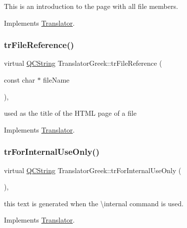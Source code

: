 This is an introduction to the page with all file members. 

Implements \mbox{\hyperlink{class_translator}{Translator}}.

\mbox{\label{class_translator_greek_ab6de6a61c25117b7a42176c9f53621d2}} 
\subsubsection{\texorpdfstring{trFileReference()}{trFileReference()}}
{\footnotesize\ttfamily virtual \mbox{\hyperlink{class_q_c_string}{Q\+C\+String}} Translator\+Greek\+::tr\+File\+Reference (\begin{DoxyParamCaption}\item[{const char $\ast$}]{file\+Name }\end{DoxyParamCaption})\hspace{0.3cm}{\ttfamily [inline]}, {\ttfamily [virtual]}}

used as the title of the H\+T\+ML page of a file 

Implements \mbox{\hyperlink{class_translator}{Translator}}.

\mbox{\label{class_translator_greek_a9d6f24a978134182dfba6ca9b32ba93e}} 
\subsubsection{\texorpdfstring{trForInternalUseOnly()}{trForInternalUseOnly()}}
{\footnotesize\ttfamily virtual \mbox{\hyperlink{class_q_c_string}{Q\+C\+String}} Translator\+Greek\+::tr\+For\+Internal\+Use\+Only (\begin{DoxyParamCaption}{ }\end{DoxyParamCaption})\hspace{0.3cm}{\ttfamily [inline]}, {\ttfamily [virtual]}}

this text is generated when the \textbackslash{}internal command is used. 

Implements \mbox{\hyperlink{class_translator}{Translator}}.

\mbox{\label{class_translator_greek_af3fe53c50bd85e7c18823547b25af4d7}} 
